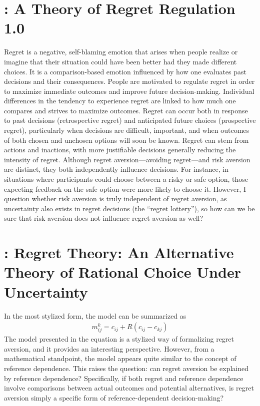 \documentclass[11pt]{elegantbook}
\begin{document}
\section{\cite{zeelenberg2007theory}: A Theory of Regret Regulation 1.0}
Regret is a negative, self-blaming emotion that arises when people realize or imagine that their situation could have been better had they made different choices. It is a comparison-based emotion influenced by how one evaluates past decisions and their consequences. People are motivated to regulate regret in order to maximize immediate outcomes and improve future decision-making. Individual differences in the tendency to experience regret are linked to how much one compares and strives to maximize outcomes. Regret can occur both in response to past decisions (retrospective regret) and anticipated future choices (prospective regret), particularly when decisions are difficult, important, and when outcomes of both chosen and unchosen options will soon be known. Regret can stem from actions and inactions, with more justifiable decisions generally reducing the intensity of regret. Although regret aversion—avoiding regret—and risk aversion are distinct, they both independently influence decisions. For instance, in situations where participants could choose between a risky or safe option, those expecting feedback on the safe option were more likely to choose it. However, I question whether risk aversion is truly independent of regret aversion, as uncertainty also exists in regret decisions (the “regret lottery”), so how can we be sure that risk aversion does not influence regret aversion as well?


\section{\cite{zeelenberg2007theory}: Regret Theory: An Alternative Theory of Rational Choice Under Uncertainty}
In the most stylized form, the model can be summarized as
\begin{equation}
    \begin{aligned}
        m_{ij}^k=c_{ij}+R(c_{ij}-c_{kj})
    \end{aligned}
    \nonumber
\end{equation}
The model presented in the equation is a stylized way of formalizing regret aversion, and it provides an interesting perspective. However, from a mathematical standpoint, the model appears quite similar to the concept of reference dependence. This raises the question: can regret aversion be explained by reference dependence? Specifically, if both regret and reference dependence involve comparisons between actual outcomes and potential alternatives, is regret aversion simply a specific form of reference-dependent decision-making?
\end{document}
